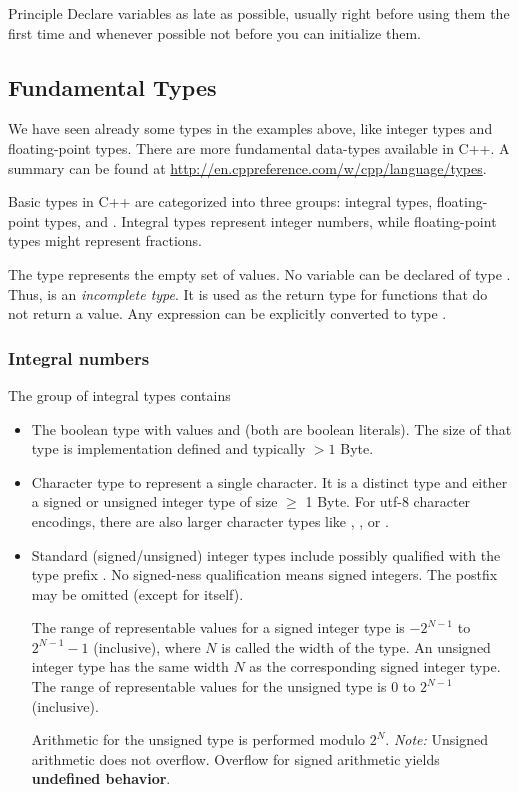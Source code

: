 \begin{guideline}{Principle}
  Declare variables as late as possible, usually right before using them the first time and whenever possible not before you can initialize them.
\end{guideline}

\subsection{Fundamental Types\label{sec:fundamental-type}}
We have seen already some types in the examples above, like integer types and floating-point types. There are more fundamental data-types
available in C++. A summary can be found at \url{http://en.cppreference.com/w/cpp/language/types}.

Basic types in C++ are categorized into three groups: integral types, floating-point types, and . Integral types represent integer numbers, while floating-point types might represent fractions.

The type  represents the empty set of values. No variable can be declared of type . Thus,  is an \emph{incomplete type}. It is used as the return type for functions that do not return a value. Any expression can be explicitly converted to type .

\subsubsection{Integral numbers}
The group of integral types contains
\begin{itemize}
  \item The boolean type  with values  and  (both are boolean literals). The size of that type is implementation
  defined and typically $> 1$ Byte.
  \item Character type  to represent a single character. It is a distinct type and either a signed or unsigned integer type of size $\geq$ 1 Byte. For utf-8 character encodings, there are also larger character types like , , or .
  \item Standard (signed/unsigned) integer types include  possibly qualified with the type prefix
  . No signed-ness qualification means signed integers. The postfix  may be omitted (except for  itself).

  The range of representable values for a signed integer type is $-2^{N-1}$ to $2^{N-1} - 1$ (inclusive), where $N$ is called the width of the type.
  An unsigned integer type has the same width $N$ as the corresponding signed integer type. The range of representable values for the unsigned type
  is $0$ to $2^{N-1}$ (inclusive).

  Arithmetic for the unsigned type is performed modulo $2^N$. \emph{Note:} Unsigned arithmetic does not overflow. Overflow for signed arithmetic
  yields \textbf{undefined behavior}.
\end{itemize}

